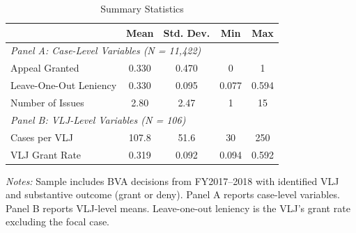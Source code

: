 
\begin{table}[H]
\centering
\caption{Summary Statistics}
\begin{threeparttable}
\begin{tabular}{lcccc}
\toprule
& Mean & Std. Dev. & Min & Max \\
\midrule
\multicolumn{5}{l}{\textit{Panel A: Case-Level Variables (N = 11,422)}} \\[0.3em]
Appeal Granted          & 0.330 & 0.470 & 0 & 1 \\
Leave-One-Out Leniency  & 0.330 & 0.095 & 0.077 & 0.594 \\
Number of Issues        & 2.80 & 2.47 & 1 & 15 \\
\midrule
\multicolumn{5}{l}{\textit{Panel B: VLJ-Level Variables (N = 106)}} \\[0.3em]
Cases per VLJ           & 107.8 & 51.6 & 30 & 250 \\
VLJ Grant Rate          & 0.319 & 0.092 & 0.094 & 0.592 \\
\bottomrule
\end{tabular}
\begin{tablenotes}[flushleft]
\small
\item \textit{Notes:} Sample includes BVA decisions from FY2017--2018 with identified VLJ and substantive outcome (grant or deny). Panel A reports case-level variables. Panel B reports VLJ-level means. Leave-one-out leniency is the VLJ's grant rate excluding the focal case.
\end{tablenotes}
\end{threeparttable}
\label{tab:summary}
\end{table}
